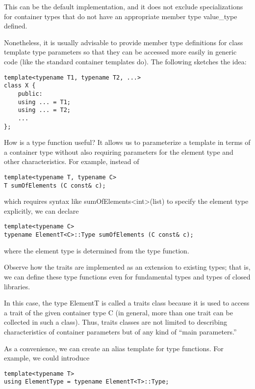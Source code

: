 This can be the default implementation, and it does not exclude specializations for container types that do not have an appropriate member type value\_type defined.

Nonetheless, it is usually advisable to provide member type definitions for class template type parameters so that they can be accessed more easily in generic code (like the standard container templates do). The following sketches the idea:

\begin{lstlisting}[style=styleCXX]
template<typename T1, typename T2, ...>
class X {
	public:
	using ... = T1;
	using ... = T2;
	...
};
\end{lstlisting}

How is a type function useful? It allows us to parameterize a template in terms of a container type without also requiring parameters for the element type and other characteristics. For example, instead of

\begin{lstlisting}[style=styleCXX]
template<typename T, typename C>
T sumOfElements (C const& c);
\end{lstlisting}

which requires syntax like sumOfElements<int>(list) to specify the element type explicitly, we can declare

\begin{lstlisting}[style=styleCXX]
template<typename C>
typename ElementT<C>::Type sumOfElements (C const& c);
\end{lstlisting}

where the element type is determined from the type function.

Observe how the traits are implemented as an extension to existing types; that is, we can define these type functions even for fundamental types and types of closed libraries.

In this case, the type ElementT is called a traits class because it is used to access a trait of the given container type C (in general, more than one trait can be collected in such a class). Thus, traits classes are not limited to describing characteristics of container parameters but of any kind of “main parameters.”

As a convenience, we can create an alias template for type functions. For example, we could introduce

\begin{lstlisting}[style=styleCXX]
template<typename T>
using ElementType = typename ElementT<T>::Type;
\end{lstlisting}

